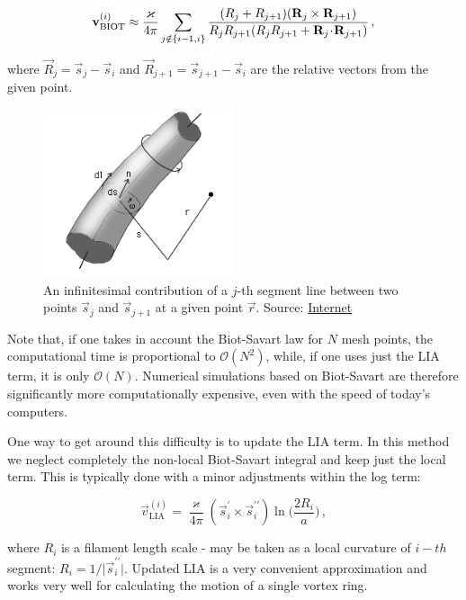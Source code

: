 \begin{equation}
\mathbf{v}_{\text{BIOT}}^{(i)} \approx
\frac{\varkappa}{4\pi}
\sum_{j \notin \{i-1, i\}}
\frac{(R_j + R_{j+1}) (\mathbf{R}_j \times \mathbf{R}_{j+1})}{R_j R_{j+1} (R_j R_{j+1} + \mathbf{R}_j \!\cdot\! \mathbf{R}_{j+1})}\,,
\end{equation}

where $\vec{R}_j = \vec{s}_j - \vec{s}_i$ and $\vec{R}_{j+1} = \vec{s}_{j+1} - \vec{s}_i$ are the relative vectors from the given point.

\begin{figure}[h]
	\centering
	\includegraphics[width=0.5\textwidth]{graphics/simul/biot}
	\caption{An infinitesimal contribution of a $j$-th segment line between two points $\vec{s}_j$ and $\vec{s}_{j+1}$ at a given point $\vec{r}$. Source: \href{http://docs.desktop.aero/appliedaero/potential3d/BiotSavart.html}{Internet}}
	\label{element}
\end{figure}

Note that, if one takes in account the Biot-Savart law for $N$ mesh points, the computational time is proportional to $\mathcal{O}(N^2)$, while, if one uses just the LIA term, it is only $\mathcal{O}(N)$. Numerical simulations based on Biot-Savart are therefore significantly more computationally expensive, even with the speed of today's computers.

One way to get around this difficulty is to update the LIA term. In this method we neglect completely the non-local Biot-Savart integral and keep just the local term. This is typically done with a minor adjustments within the log term:

\begin{equation}
\vec{v}_{\text{LIA}}^{(i)} =
\frac{\varkappa}{4\pi} (\vec{s}^{\prime}_i \times \vec{s}^{\prime \prime}_i)
\ln{\Bigg(\frac{2 R_i}{a}\Bigg)}\,,
\end{equation}

where $R_i$ is a filament length scale - may be taken \cite{schwarz_filament} as a local curvature of $i-th$ segment: $R_i = 1 / \vert \vec{s}^{\prime \prime}_i \vert$. Updated LIA is a very convenient approximation and works very well for calculating the motion of a single vortex ring.

